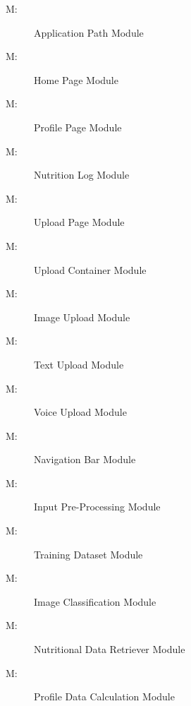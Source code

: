 \documentclass[12pt, titlepage]{article}
\newcounter{mnum}
\newcommand{\mthemnum}{M\themnum}
\begin{document}
\begin{description}
\item [ \mthemnum \label{mAP}:] Application Path Module
\item  [ \mthemnum \label{mHP}:] Home Page Module
\item  [ \mthemnum \label{mPP}:] Profile Page Module
\item  [ \mthemnum \label{mNL}:] Nutrition Log Module
\item  [ \mthemnum \label{mUP}:] Upload Page Module
\item  [ \mthemnum \label{mUC}:] Upload Container Module
\item  [ \mthemnum \label{mIU}:] Image Upload Module
\item  [ \mthemnum \label{mTU}:] Text Upload Module
\item  [ \mthemnum \label{mVU}:] Voice Upload Module
\item  [ \mthemnum \label{mNB}:] Navigation Bar Module
\item  [ \mthemnum \label{mIP}:] Input Pre-Processing Module
\item  [ \mthemnum \label{mTD}:] Training Dataset Module
\item  [ \mthemnum \label{mIC}:] Image Classification Module
\item  [ \mthemnum \label{mNDR}:] Nutritional Data Retriever Module
\item  [ \mthemnum \label{mPDC}:] Profile Data Calculation 
Module
\end{description}
\end{document}
